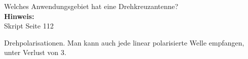 \begin{question}[section=11,name={Drehkreuzantenne 1},difficulty=,quantity=4,type=thr,tags={20160310,20131210}]
	Welches Anwendungsgebiet hat eine Drehkreuzantenne?
	\\ \textbf{Hinweis:}\\
	Skript Seite 112
\end{question}
\begin{solution}
	Drehpolarisationen. Man kann auch jede linear polarisierte Welle empfangen, unter Verlust von \unit{3}\deci\bel.
\end{solution}